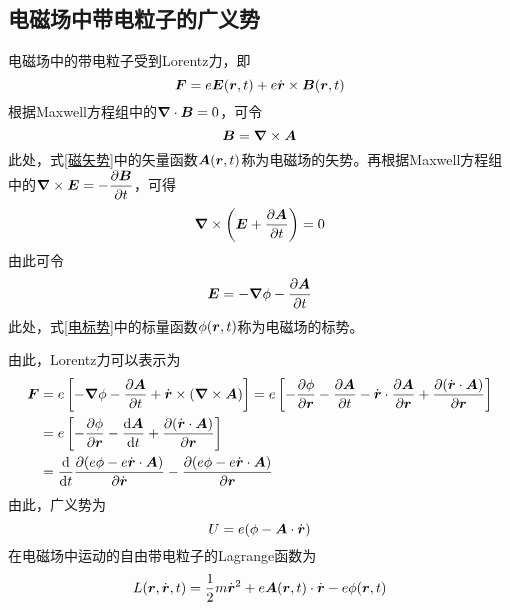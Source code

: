 \subsection{电磁场中带电粒子的广义势}\label{chapter2:subsection-电磁场中带电粒子的广义势能}

电磁场中的带电粒子受到Lorentz力，即
\begin{equation}
	\boldsymbol{F} = e\boldsymbol{E}(\boldsymbol{r},t) + e\dot{\boldsymbol{r}} \times \boldsymbol{B}(\boldsymbol{r},t)
\end{equation}
根据Maxwell方程组中的$\boldsymbol{\nabla} \cdot \boldsymbol{B} = 0$，可令
\begin{equation}
	\boldsymbol{B} = \boldsymbol{\nabla} \times \boldsymbol{A}
	\label{磁矢势}
\end{equation}
此处，式\eqref{磁矢势}中的矢量函数$\boldsymbol{A}(\boldsymbol{r},t)$称为{\heiti 电磁场的矢势}。再根据Maxwell方程组中的$\displaystyle \boldsymbol{\nabla} \times \boldsymbol{E} = -\frac{\partial \boldsymbol{B}}{\partial t}$，可得
\begin{equation*}
	\boldsymbol{\nabla} \times \left(\boldsymbol{E} + \frac{\partial \boldsymbol{A}}{\partial t}\right) = 0
\end{equation*}
由此可令
\begin{equation}
	\boldsymbol{E} = -\boldsymbol{\nabla} \phi - \frac{\partial \boldsymbol{A}}{\partial t}
	\label{电标势}
\end{equation}
此处，式\eqref{电标势}中的标量函数$\phi(\boldsymbol{r},t)$称为{\heiti 电磁场的标势}。

由此，Lorentz力可以表示为
\begin{align}
	\boldsymbol{F} & = e\left[-\boldsymbol{\nabla} \phi - \frac{\partial \boldsymbol{A}}{\partial t} + \dot{\boldsymbol{r}} \times (\boldsymbol{\nabla} \times \boldsymbol{A})\right] = e\left[-\frac{\partial \phi}{\partial \boldsymbol{r}} - \frac{\partial \boldsymbol{A}}{\partial t} - \dot{\boldsymbol{r}} \cdot \frac{\partial \boldsymbol{A}}{\partial \boldsymbol{r}} + \frac{\partial (\dot{\boldsymbol{r}} \cdot \boldsymbol{A})}{\partial \boldsymbol{r}}\right] \nonumber \\
	& = e\left[-\frac{\partial \phi}{\partial \boldsymbol{r}} - \frac{\mathrm{d} \boldsymbol{A}}{\mathrm{d} t} + \frac{\partial (\dot{\boldsymbol{r}} \cdot \boldsymbol{A})}{\partial \boldsymbol{r}}\right] \nonumber \\
	& = \frac{\mathrm{d}}{\mathrm{d} t} \frac{\partial (e\phi - e\dot{\boldsymbol{r}}\cdot \boldsymbol{A})}{\partial \dot{\boldsymbol{r}}} - \frac{\partial (e\phi - e\dot{\boldsymbol{r}}\cdot \boldsymbol{A})}{\partial \boldsymbol{r}}
\end{align}
由此，广义势为
\begin{equation}
	U = e(\phi - \boldsymbol{A} \cdot \dot{\boldsymbol{r}})
	\label{电磁场中带电粒子的广义势}
\end{equation}
在电磁场中运动的自由带电粒子的Lagrange函数为
\begin{equation}
	L(\boldsymbol{r},\dot{\boldsymbol{r}},t) = \frac12 m \dot{\boldsymbol{r}}^2 + e\boldsymbol{A}(\boldsymbol{r},t) \cdot \dot{\boldsymbol{r}} - e\phi(\boldsymbol{r},t)
	\label{电磁场中点电粒子的Lagrange函数}
\end{equation}

